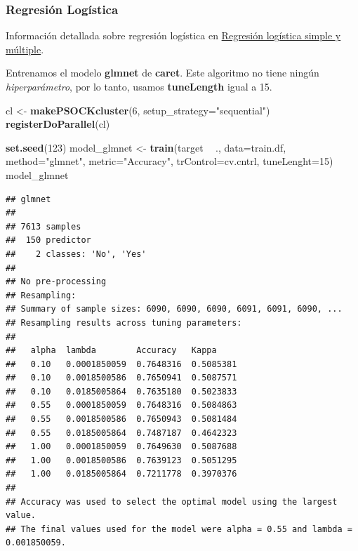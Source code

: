 \documentclass[]{article}
\newenvironment{Shaded}{\begin{snugshade}}{\end{snugshade}}
\newcommand{\DataTypeTok}[1]{\textcolor[rgb]{0.13,0.29,0.53}{#1}}
\newcommand{\DecValTok}[1]{\textcolor[rgb]{0.00,0.00,0.81}{#1}}
\newcommand{\KeywordTok}[1]{\textcolor[rgb]{0.13,0.29,0.53}{\textbf{#1}}}
\newcommand{\NormalTok}[1]{#1}
\newcommand{\OperatorTok}[1]{\textcolor[rgb]{0.81,0.36,0.00}{\textbf{#1}}}
\newcommand{\StringTok}[1]{\textcolor[rgb]{0.31,0.60,0.02}{#1}}
\begin{document}
\hypertarget{regresiuxf3n-loguxedstica}{%
\subsubsection{Regresión Logística}\label{regresiuxf3n-loguxedstica}}

Información detallada sobre regresión logística en
\href{https://www.cienciadedatos.net/documentos/27_regresion_logistica_simple_y_multiple}{\color{blue}Regresión
logística simple y múltiple}.

Entrenamos el modelo \textbf{glmnet} de \textbf{caret}. Este algoritmo no tiene
ningún \emph{hiperparámetro}, por lo tanto, usamos \textbf{tuneLength} igual a 15.

\vspace{3mm}

\begin{Shaded}
\begin{Highlighting}[]
\NormalTok{cl <-}\StringTok{ }\KeywordTok{makePSOCKcluster}\NormalTok{(}\DecValTok{6}\NormalTok{, }\DataTypeTok{setup_strategy=}\StringTok{"sequential"}\NormalTok{)}
\KeywordTok{registerDoParallel}\NormalTok{(cl)}
\end{Highlighting}
\end{Shaded}

\begin{Shaded}
\begin{Highlighting}[]
\KeywordTok{set.seed}\NormalTok{(}\DecValTok{123}\NormalTok{)}
\NormalTok{model_glmnet <-}\StringTok{ }\KeywordTok{train}\NormalTok{(target }\OperatorTok{~}\StringTok{ }\NormalTok{., }\DataTypeTok{data=}\NormalTok{train.df,}
                      \DataTypeTok{method=}\StringTok{"glmnet"}\NormalTok{,}
                      \DataTypeTok{metric=}\StringTok{"Accuracy"}\NormalTok{,}
                      \DataTypeTok{trControl=}\NormalTok{cv.cntrl,}
                      \DataTypeTok{tuneLenght=}\DecValTok{15}\NormalTok{)}
\NormalTok{model_glmnet}
\end{Highlighting}
\end{Shaded}

\begin{verbatim}
## glmnet 
## 
## 7613 samples
##  150 predictor
##    2 classes: 'No', 'Yes' 
## 
## No pre-processing
## Resampling: 
## Summary of sample sizes: 6090, 6090, 6090, 6091, 6091, 6090, ... 
## Resampling results across tuning parameters:
## 
##   alpha  lambda        Accuracy   Kappa    
##   0.10   0.0001850059  0.7648316  0.5085381
##   0.10   0.0018500586  0.7650941  0.5087571
##   0.10   0.0185005864  0.7635180  0.5023833
##   0.55   0.0001850059  0.7648316  0.5084863
##   0.55   0.0018500586  0.7650943  0.5081484
##   0.55   0.0185005864  0.7487187  0.4642323
##   1.00   0.0001850059  0.7649630  0.5087688
##   1.00   0.0018500586  0.7639123  0.5051295
##   1.00   0.0185005864  0.7211778  0.3970376
## 
## Accuracy was used to select the optimal model using the largest value.
## The final values used for the model were alpha = 0.55 and lambda = 0.001850059.
\end{verbatim}
\end{document}
